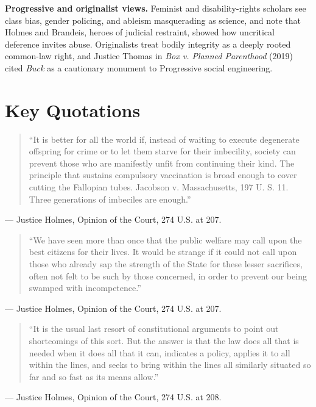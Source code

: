 \documentclass[12pt]{article}
\begin{document}
\textbf{Progressive and originalist views.} Feminist and disability-rights scholars see class bias, gender policing, and ableism masquerading as science, and note that Holmes and Brandeis, heroes of judicial restraint, showed how uncritical deference invites abuse. Originalists treat bodily integrity as a deeply rooted common-law right, and Justice Thomas in \textit{Box v. Planned Parenthood} (2019) cited \textit{Buck} as a cautionary monument to Progressive social engineering.

\section{Key Quotations}

\begin{quote}
``It is better for all the world if, instead of waiting to execute degenerate offspring for crime or to let them starve for their imbecility, society can prevent those who are manifestly unfit from continuing their kind. The principle that sustains compulsory vaccination is broad enough to cover cutting the Fallopian tubes. Jacobson v. Massachusetts, 197 U. S. 11. Three generations of imbeciles are enough.''
\end{quote}
\noindent --- Justice Holmes, Opinion of the Court, 274 U.S. at 207.

\begin{quote}
``We have seen more than once that the public welfare may call upon the best citizens for their lives. It would be strange if it could not call upon those who already sap the strength of the State for these lesser sacrifices, often not felt to be such by those concerned, in order to prevent our being swamped with incompetence.''
\end{quote}
\noindent --- Justice Holmes, Opinion of the Court, 274 U.S. at 207.

\begin{quote}
``It is the usual last resort of constitutional arguments to point out shortcomings of this sort. But the answer is that the law does all that is needed when it does all that it can, indicates a policy, applies it to all within the lines, and seeks to bring within the lines all similarly situated so far and so fast as its means allow.''
\end{quote}
\noindent --- Justice Holmes, Opinion of the Court, 274 U.S. at 208.
\end{document}
